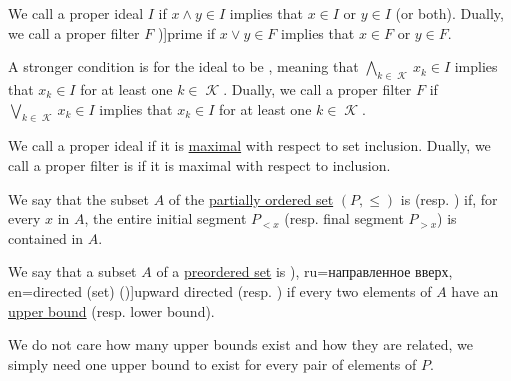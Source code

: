 \begin{definition}
\begin{thmenum}
    \begin{TwoColumns}
      We call a proper ideal \( I \)  if \( {x \wedge y \in I} \) implies that \( {x \in I} \) or \( {y \in I} \) (or both).
    \BeginSecondColumn
      Dually, we call a proper filter \( F \) \term[ru=простой (фильтр) (\cite[183]{Гуров2013})]{prime} if \( {x \vee y \in F} \) implies that \( {x \in F} \) or \( {y \in F} \).
    \end{TwoColumns}

    \begin{TwoColumns}
      A stronger condition is for the ideal to be , meaning that \( \bigwedge_{k \in \mscrK} x_k \in I \) implies that \( x_k \in I \) for at least one \( k \in \mscrK \).
    \BeginSecondColumn
      Dually, we call a proper filter \( F \)  if \( \bigvee_{k \in \mscrK} x_k \in I \) implies that \( x_k \in I \) for at least one \( k \in \mscrK \).
    \end{TwoColumns}

    \begin{TwoColumns}
      We call a proper ideal  if it is \hyperref[def:extremal_points/maximal_and_minimal_element]{maximal} with respect to set inclusion.
    \BeginSecondColumn
      Dually, we call a proper filter is  if it is maximal with respect to inclusion.
    \end{TwoColumns}
  \end{thmenum}
\end{definition}

\begin{definition}\label{def:closed_ordered_subset}
  We say that the subset \( A \) of the \hyperref[def:partially_ordered_set]{partially ordered set} \( (P, \leq) \) is  (resp. ) if, for every \( x \) in \( A \), the entire initial segment \( P_{<x} \) (resp. final segment \( P_{>x} \)) is contained in \( A \).
\end{definition}

\begin{definition}\label{def:directed_set}
  We say that a subset \( A \) of a \hyperref[def:preordered_set]{preordered set} is \term[bg=насочено надясно (множество) (\cite[10]{Проданов1982}), ru=направленное вверх, en=directed (set) (\cite[332]{PicadoPultr2012})]{upward directed} (resp. ) if every two elements of \( A \) have an \hyperref[def:extremal_points/bounds]{upper bound} (resp. lower bound).
\end{definition}
\begin{comments}
  \item We do not care how many upper bounds exist and how they are related, we simply need one upper bound to exist for every pair of elements of \( P \).
\end{comments}

